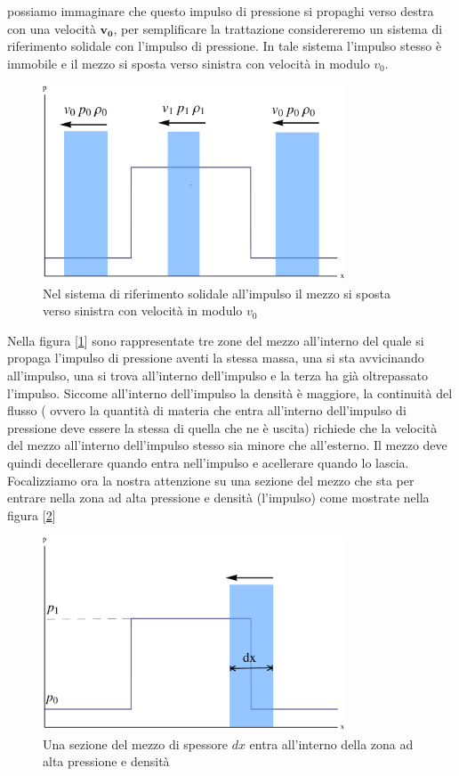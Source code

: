 \documentclass[a4paper,10pt,twoside]{article}
\begin{document}
possiamo immaginare che questo impulso di pressione si propaghi verso destra con una velocità $\mathbf{v_0}$, per semplificare la trattazione considereremo un sistema di riferimento solidale con l'impulso di pressione. In tale sistema l'impulso stesso è immobile e il mezzo si sposta verso sinistra con velocità in modulo $v_0$. 
\begin{figure}[h]
 \begin{center}
  \includegraphics[width=0.8\textwidth]{pressione2.pdf}
 \end{center}
\caption{Nel sistema di riferimento solidale all'impulso il mezzo si sposta verso sinistra con velocità in modulo $v_0$}\label{mezzo}
\end{figure}
Nella figura [\ref{mezzo}] sono rappresentate tre zone del mezzo all'interno del quale si propaga l'impulso di pressione aventi la stessa massa, una si sta avvicinando all'impulso, una si trova all'interno dell'impulso e la terza ha già oltrepassato l'impulso. Siccome all'interno dell'impulso la densità è maggiore, la continuità del flusso ( ovvero la quantità di materia che entra all'interno dell'impulso di pressione deve essere la stessa di quella che ne è uscita) richiede che la velocità del mezzo all'interno dell'impulso stesso sia minore che all'esterno. Il mezzo deve quindi decellerare quando entra nell'impulso e acellerare quando lo lascia.
Focalizziamo ora la nostra attenzione su una sezione del mezzo che sta per entrare nella zona ad alta pressione e densità (l'impulso) come mostrate nella figura [\ref{entra}]
\begin{figure}[h]
\begin{center}
 \includegraphics[width=0.8\textwidth]{pressione3.pdf}
\end{center}
 \caption{Una sezione del mezzo di spessore $dx$ entra all'interno della zona ad alta pressione e densità}\label{entra}
\end{figure}
\end{document}
